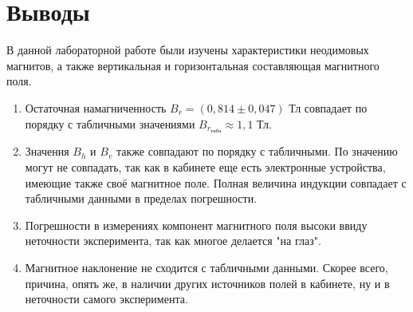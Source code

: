 \documentclass[a4paper, 12pt]{article}
\begin{document}
	\section*{Выводы}
	В данной лабораторной работе были изучены характеристики неодимовых магнитов, а также вертикальная и горизонтальная составляющая магнитного поля. \\
	\begin{enumerate}
		\item Остаточная намагниченность $B_r = (0,814 \pm 0,047)$ Тл совпадает по порядку с табличными значениями $B_{r_{\text{табл}}} \approx 1,1$ Тл.
		\item Значения $B_h$ и $B_v$ также совпадают по порядку с табличными. По значению могут не совпадать, так как в кабинете еще есть электронные устройства, имеющие также своё магнитное поле. Полная величина индукции совпадает с табличными данными в пределах погрешности.
		\item Погрешности в измерениях компонент магнитного поля высоки ввиду неточности эксперимента, так как многое делается "на глаз".
		\item Магнитное наклонение не сходится с табличными данными. Скорее всего, причина, опять же, в наличии других источников полей в кабинете, ну и в неточности самого эксперимента.
	\end{enumerate}
	
	
\end{document}
